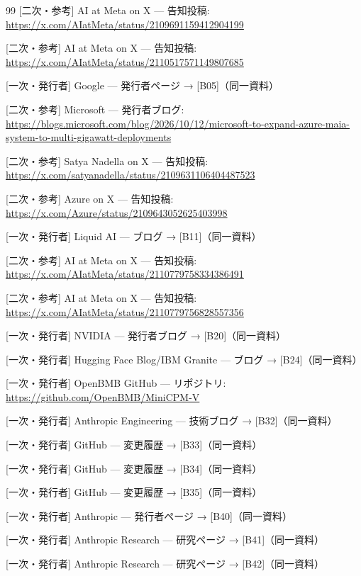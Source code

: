 \documentclass[lualatex,a4paper,10pt]{jlreq}
\begin{document}
\begin{thebibliography}{99}
 [二次・参考] AI at Meta on X — 告知投稿: \url{https://x.com/AIatMeta/status/2109691159412904199}

 [二次・参考] AI at Meta on X — 告知投稿: \url{https://x.com/AIatMeta/status/2110517571149807685}

 [一次・発行者] Google — 発行者ページ → [B05]（同一資料）

 [二次・参考] Microsoft — 発行者ブログ: \url{https://blogs.microsoft.com/blog/2026/10/12/microsoft-to-expand-azure-maia-system-to-multi-gigawatt-deployments}

 [二次・参考] Satya Nadella on X — 告知投稿: \url{https://x.com/satyanadella/status/2109631106404487523}

 [二次・参考] Azure on X — 告知投稿: \url{https://x.com/Azure/status/2109643052625403998}

 [一次・発行者] Liquid AI — ブログ → [B11]（同一資料）

 [二次・参考] AI at Meta on X — 告知投稿: \url{https://x.com/AIatMeta/status/2110779758334386491}

 [二次・参考] AI at Meta on X — 告知投稿: \url{https://x.com/AIatMeta/status/2110779756828557356}

 [一次・発行者] NVIDIA — 発行者ブログ → [B20]（同一資料）

 [一次・発行者] Hugging Face Blog/IBM Granite — ブログ → [B24]（同一資料）

 [一次・発行者] OpenBMB GitHub — リポジトリ: \url{https://github.com/OpenBMB/MiniCPM-V}

 [一次・発行者] Anthropic Engineering — 技術ブログ → [B32]（同一資料）

 [一次・発行者] GitHub — 変更履歴 → [B33]（同一資料）

 [一次・発行者] GitHub — 変更履歴 → [B34]（同一資料）

 [一次・発行者] GitHub — 変更履歴 → [B35]（同一資料）

 [一次・発行者] Anthropic — 発行者ページ → [B40]（同一資料）

 [一次・発行者] Anthropic Research — 研究ページ → [B41]（同一資料）

 [一次・発行者] Anthropic Research — 研究ページ → [B42]（同一資料）


\end{thebibliography}
\end{document}
